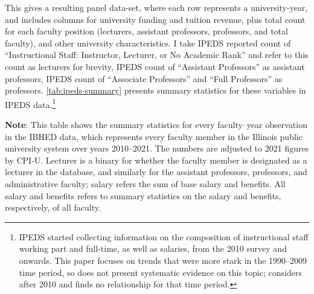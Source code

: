 This gives a resulting panel data-set, where each row represents a university-year, and includes columns for university funding and tuition revenue, plus total count for each faculty position (lecturers, assistant professors, professors, and total faculty), and other university characteristics.
I take IPEDS reported count of ``Instructional Staff: Instructor, Lecturer, or No Academic Rank'' and refer to this count as lecturers for brevity, IPEDS count of ``Assistant Professors'' as assistant professors, IPEDS count of ``Associate Professors'' and ``Full Professors'' as professors.
\autoref{tab:ipeds-summary} presents summary statistics for these variables in IPEDS data.\footnote{
    IPEDS started collecting information on the composition of instructional staff working part and full-time, as well as salaries, from the 2010 survey and onwards.
    This paper focuses on trends that were more stark in the 1990--2009 time period, so does not present systematic evidence on this topic; \cite{hinrichs2022state} considers after 2010 and finds no relationship for that time period.
}

\begin{table}[!h]
    \singlespacing
    \centering
    \caption{IBHED Summary Statistics, Faculty Panel 2010--2021.}
    \makebox[\textwidth][c]{}
    \label{tab:illinois-summary}
    \justify
    \footnotesize
    \textbf{Note}:
    This table shows the summary statistics for every faculty--year observation in the IBHED data, which represents every faculty member in the Illinois public university system over years 2010--2021.
    The numbers are adjusted to 2021 figures by CPI-U.
    Lecturer is a binary for whether the faculty member is designated as a lecturer in the database, and similarly for the assistant professors, professors, and administrative faculty;
    salary refers the sum of base salary and benefits.
    All salary and benefits refers to summary statistics on the salary and benefits, respectively, of all faculty.
\end{table}

